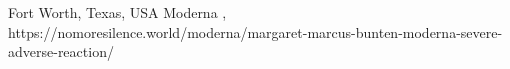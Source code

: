           {
            Fort Worth, Texas, USA
          }
          {
          }
          {
            Moderna
          }
          {
          }
          {
            ,
          }
          {
            https://nomoresilence.world/moderna/margaret-marcus-bunten-moderna-severe-adverse-reaction/
          }

